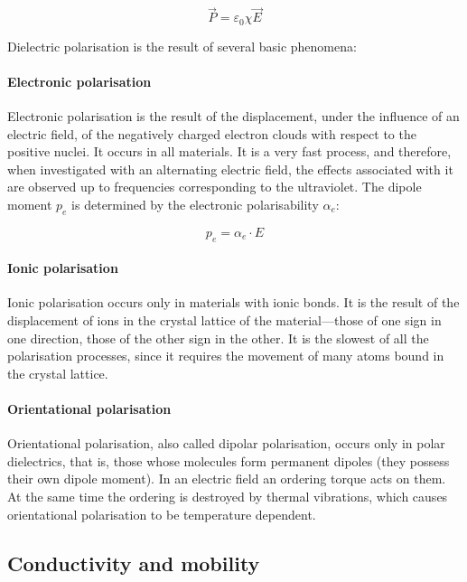 \begin{equation}
    \vec{P} = \varepsilon_0\chi\vec{E}
\end{equation}

Dielectric polarisation is the result of several basic phenomena:

\paragraph{Electronic polarisation}

Electronic polarisation is the result of the displacement, under the influence of an electric field, of the negatively charged electron clouds with respect to the positive nuclei. It occurs in all materials. It is a very fast process, and therefore, when investigated with an alternating electric field, the effects associated with it are observed up to frequencies corresponding to the ultraviolet. The dipole moment $p_e$ is determined by the electronic polarisability $\alpha_e$:

\begin{equation}
    p_e = \alpha_e \cdot E
\end{equation}

\paragraph{Ionic polarisation}

Ionic polarisation occurs only in materials with ionic bonds. It is the result of the displacement of ions in the crystal lattice of the material---those of one sign in one direction, those of the other sign in the other. It is the slowest of all the polarisation processes, since it requires the movement of many atoms bound in the crystal lattice.

\paragraph{Orientational polarisation}

Orientational polarisation, also called dipolar polarisation, occurs only in polar dielectrics, that is, those whose molecules form permanent dipoles (they possess their own dipole moment). In an electric field an ordering torque acts on them. At the same time the ordering is destroyed by thermal vibrations, which causes orientational polarisation to be temperature dependent.

\subsection{Conductivity and mobility}

